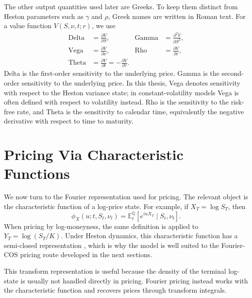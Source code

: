 The other output quantities used later are Greeks. To keep them distinct from Heston parameters such as $\gamma$ and $\rho$, Greek names are written in Roman text. For a value function $V(S,\nu,t;r)$, we use
\begin{equation}
    \begin{aligned}
    \mathrm{Delta} &= \frac{\partial V}{\partial S}, &
    \mathrm{Gamma} &= \frac{\partial^2 V}{\partial S^2}, \\[0.35em]
    \mathrm{Vega} &= \frac{\partial V}{\partial \nu}, &
    \mathrm{Rho} &= \frac{\partial V}{\partial r}, \\[0.35em]
    \mathrm{Theta} &= \frac{\partial V}{\partial t}=-\frac{\partial V}{\partial \tau}.
    \end{aligned}
\end{equation}
Delta is the first-order sensitivity to the underlying price. Gamma is the second-order sensitivity to the underlying price. In this thesis, Vega denotes sensitivity with respect to the Heston variance state; in constant-volatility models Vega is often defined with respect to volatility instead. Rho is the sensitivity to the risk-free rate, and Theta is the sensitivity to calendar time, equivalently the negative derivative with respect to time to maturity.

\section{Pricing Via Characteristic Functions}
\label{sec:pricing_characteristic_functions}
We now turn to the Fourier representation used for pricing. The relevant object is the characteristic function of a log-price state. For example, if $X_T=\log S_T$, then
\begin{equation}
    \phi_X(u;t,S_t,\nu_t)
    =\mathbb E_t^{\mathbb Q}\!\left[e^{iuX_T}\mid S_t,\nu_t\right].
\end{equation}
When pricing by log-moneyness, the same definition is applied to $Y_T=\log(S_T/K)$. Under Heston dynamics, this characteristic function has a semi-closed representation \cite{heston}, which is why the model is well suited to the Fourier-COS pricing route developed in the next sections.

This transform representation is useful because the density of the terminal log-state is usually not handled directly in pricing. Fourier pricing instead works with the characteristic function and recovers prices through transform integrals.


